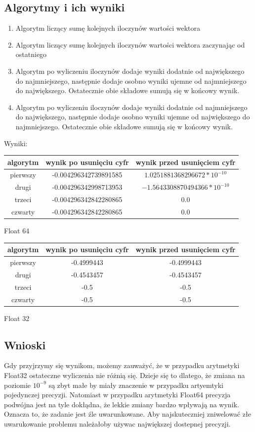\documentclass[11pt, a4paper]{article}
\begin{document}
\subsection{Algorytmy i ich wyniki}
\begin{enumerate}
  \item Algorytm liczący sumę kolejnych iloczynów wartości wektora
  \item Algorytm liczący sumę kolejnych iloczynów wartości wektora zaczynając od ostatniego
  \item Algorytm po wyliczeniu iloczynów dodaje wyniki dodatnie od największego do najmniejszego, następnie dodaje osobno wyniki ujemne od najmniejszego do największego. Ostatecznie obie składowe sumują się w końcowy wynik.
  \item Algorytm po wyliczeniu iloczynów dodaje wyniki dodatnie od najmniejszego do największego, następnie dodaje osobno wyniki ujemne od największego do najmniejszego. Ostatecznie obie składowe sumują się w końcowy wynik.
\end{enumerate}
Wyniki:
\begin{center}
  \begin{tabular}{c|c|c}
    algorytm & wynik po usunięciu cyfr & wynik przed usunięciem cyfr\\
    \hline
    pierwszy & -0.004296342739891585 & $1.0251881368296672 * 10^{-10}$\\
    drugi & -0.004296342998713953 & $-1.5643308870494366 * 10^{-10}$\\
    trzeci & -0.004296342842280865 & 0.0\\
    czwarty & -0.004296342842280865 & 0.0
  \end{tabular} \par
  \bigskip
  Float 64
\end{center}
\begin{center}
  \begin{tabular}{c|c|c}
    algorytm & wynik po usunięciu cyfr & wynik przed usunięciem cyfr\\
    \hline
    pierwszy & -0.4999443 & -0.4999443\\
    drugi & -0.4543457 & -0.4543457\\
    trzeci & -0.5 & -0.5\\
    czwarty & -0.5 & -0.5
  \end{tabular} \par
  \bigskip
  Float 32
\end{center}

\subsection{Wnioski}
Gdy przyjrzymy się wynikom, możemy zauważyć, że w przypadku arytmetyki Float32 ostateczne wyliczenia nie różnią się. Dzieje się to dlatego, że zmiana na poziomie $10^{-9}$ są zbyt małe by miały znaczenie w przypadku artyemtyki pojedynczej precyzji. Natomiast w przypadku arytmetyki Float64 precyzja podwójna jest na tyle dokłądna, że lekkie zmiany bardzo wpływają na wynik. Oznacza to, że zadanie jest źle uwarunkowane. Aby najskuteczniej zniwelować złe uwarukowanie problemu należałoby używac największej dostepnej precyzji. 
\end{document}
